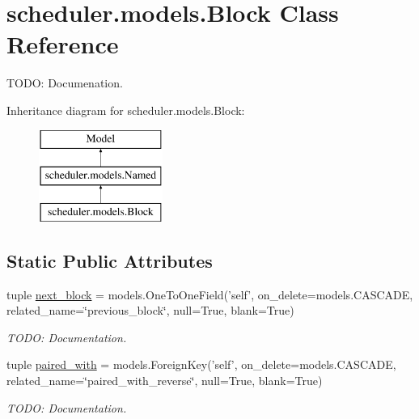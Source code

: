 \hypertarget{classscheduler_1_1models_1_1_block}{\section{scheduler.\-models.\-Block Class Reference}
\label{classscheduler_1_1models_1_1_block}
}


T\-O\-D\-O\-: Documenation.  


Inheritance diagram for scheduler.\-models.\-Block\-:\begin{figure}[H]
\begin{center}
\leavevmode
\includegraphics[height=3.000000cm]{classscheduler_1_1models_1_1_block}
\end{center}
\end{figure}
\subsection*{Static Public Attributes}
\begin{DoxyCompactItemize}
\item 
\hypertarget{classscheduler_1_1models_1_1_block_ab78204367b89bd16c9cb000d6bc8ecc6}{tuple \hyperlink{classscheduler_1_1models_1_1_block_ab78204367b89bd16c9cb000d6bc8ecc6}{next\-\_\-block} = models.\-One\-To\-One\-Field('self', on\-\_\-delete=models.\-C\-A\-S\-C\-A\-D\-E, related\-\_\-name=\char`\"{}previous\-\_\-block\char`\"{}, null=True, blank=True)}\label{classscheduler_1_1models_1_1_block_ab78204367b89bd16c9cb000d6bc8ecc6}

\begin{DoxyCompactList}\small\item\em T\-O\-D\-O\-: Documentation. \end{DoxyCompactList}\item 
\hypertarget{classscheduler_1_1models_1_1_block_aa869281bbcdb191ddc5c0ed335e63109}{tuple \hyperlink{classscheduler_1_1models_1_1_block_aa869281bbcdb191ddc5c0ed335e63109}{paired\-\_\-with} = models.\-Foreign\-Key('self', on\-\_\-delete=models.\-C\-A\-S\-C\-A\-D\-E, related\-\_\-name=\char`\"{}paired\-\_\-with\-\_\-reverse\char`\"{}, null=True, blank=True)}\label{classscheduler_1_1models_1_1_block_aa869281bbcdb191ddc5c0ed335e63109}

\begin{DoxyCompactList}\small\item\em T\-O\-D\-O\-: Documentation. \end{DoxyCompactList}\end{DoxyCompactItemize}
